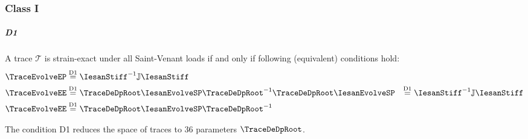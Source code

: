 
\subsubsection{Class I}

\subparagraph{D1}

\begin{proposition}[D1]
A trace \(\mathcal{T}\) is strain-exact under all Saint-Venant loads if and only if following (equivalent) conditions hold:
\begin{align}
    \TraceEvolveEP &\stackrel{\rm D1}{=} \IesanStiff^{-1}\mathbb{J}\IesanStiff \label{eq:e1-g} \\
    \TraceEvolveEE &\stackrel{\rm D1}{=} \TraceDeDpRoot\IesanEvolveSP\TraceDeDpRoot^{-1} %
    \TraceDeDpRoot\IesanEvolveSP &\stackrel{\rm D1}{=} \IesanStiff^{-1}\mathbb{J}\IesanStiff \label{eq:e1-g} \\
    \TraceEvolveEE &\stackrel{\rm D1}{=} 
    \TraceDeDpRoot\IesanEvolveSP\TraceDeDpRoot^{-1} %
    \label{eq:e1-j} \\
\end{align}
\end{proposition}
The condition D1 reduces the space of traces to 36 parameters \(\TraceDeDpRoot\). 

